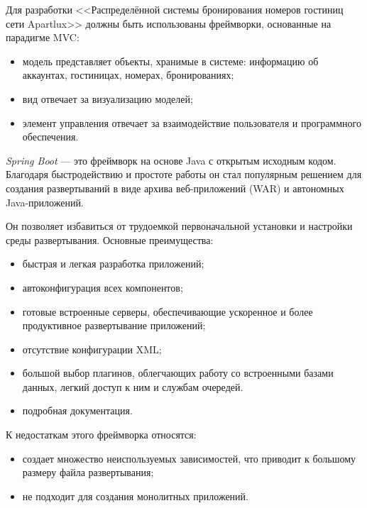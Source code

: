 Для  разработки  <<Распределённой системы бронирования номеров гостиниц сети Apartlux>> должны быть использованы  фреймворки,  основанные  на парадигме MVC:
\begin{itemize}
	\item модель представляет объекты, хранимые в системе: информацию об аккаунтах, гостиницах, номерах, бронированиях;
	
	\item вид  отвечает  за  визуализацию  моделей;
	
	\item элемент управления отвечает за взаимодействие пользователя и программного обеспечения.
\end{itemize}

\textit{Spring Boot} \cite{bib:spring} — это фреймворк на основе Java с открытым исходным кодом. Благодаря быстродействию и простоте работы он стал популярным решением для создания развертываний в виде архива веб-приложений (WAR) и автономных Java-приложений.

Он позволяет избавиться от трудоемкой первоначальной установки и настройки среды развертывания. Основные преимущества:
\begin{itemize}
	\item быстрая и легкая разработка приложений;
	
	\item автоконфигурация всех компонентов;
	
	\item готовые встроенные серверы, обеспечивающие ускоренное и более продуктивное развертывание приложений;
	
	\item отсутствие конфигурации XML;
	
	\item большой выбор плагинов, облегчающих работу со встроенными базами данных, легкий доступ к ним и службам очередей.
	
	\item подробная документация.
\end{itemize}

К недостаткам этого фреймворка относятся:
\begin{itemize}
	\item создает множество неиспользуемых зависимостей, что приводит к большому размеру файла развертывания;
	
	\item не подходит для создания монолитных приложений.
\end{itemize}

